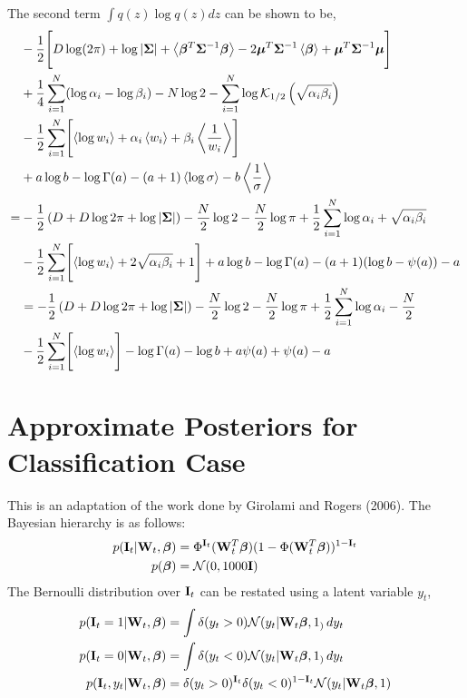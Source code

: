 \begin{appendices}
The second term $\int q(z)\log q(z)dz$ can be shown to be,
\begin{align}
\nonumber&-\frac{1}{2}\Biggl[D\log(2\pi)+\log |{\mathbf{\Sigma}}|+\left\langle\bm{\beta}^T{\mathbf{\Sigma}}^{-1}\bm{\beta}\right\rangle-2{\boldsymbol{\mu}}^T{\mathbf{\Sigma}}^{-1}\left\langle\bm{\beta}\right\rangle+{\boldsymbol{\mu}}^T{\mathbf{\Sigma}}^{-1}{\boldsymbol{\mu}}\Biggr]\\
&\nonumber+\frac{1}{4}\sum_{i=1}^{N}(\log\alpha_i-\log\beta_i)-N\log 2- \sum_{i=1}^{N}\log\mathcal{K}_{1/2}\left(\sqrt{\alpha_i\beta_i}\right)\\
\nonumber&-\frac{1}{2}\sum_{i=1}^{N}\Biggl[\left\langle\log w_i\right\rangle +\alpha_i\left\langle w_i\right\rangle+\beta_i\left\langle\frac{1}{w_i}\right\rangle\Biggr]\\
&\nonumber +a\log b - \log \Gamma(a)-(a+1)\left\langle\log \sigma\right\rangle-b\left\langle\frac{1}{\sigma}\right\rangle
\\ \nonumber=&-\frac{1}{2}\left(D+D\log2\pi+\log|{\mathbf{\Sigma}}|\right)-\frac{N}{2}\log 2-\frac{N}{2}\log\pi+\frac{1}{2}\sum_{i=1}^{N}\log\alpha_i+\sqrt{\alpha_i\beta_i}\\
\nonumber&-\frac{1}{2}\sum_{i=1}^{N}\Biggl[\left\langle\log w_i\right\rangle +2\sqrt{\alpha_i\beta_i}+1\Biggr]+a\log b -\log \Gamma(a)-(a+1)(\log b-\psi(a))-a\\
&\nonumber=-\frac{1}{2}\left(D+D\log2\pi+\log|{\mathbf{\Sigma}}|\right)-\frac{N}{2}\log 2-\frac{N}{2}\log\pi+\frac{1}{2}\sum_{i=1}^{N}\log\alpha_i-\frac{N}{2}\\
&-\frac{1}{2}\sum_{i=1}^{N}\Biggl[\left\langle\log w_i\right\rangle\Biggr]-\log \Gamma(a)-\log b+a\psi(a)+\psi(a)-a
\end{align}

\section{Approximate Posteriors for Classification Case}
This is an adaptation of the work done by Girolami and Rogers (2006). The Bayesian hierarchy is as follows:
\begin{align}
\nonumber p(\mathbf{I}_t|\mathbf{W}_t,\bm{\beta})&=\Phi^{\mathbf{I}_t}(\mathbf{W}_t^T\bm{\beta})(1-\Phi(\mathbf{W}_t^T\bm{\beta}))^{1-\mathbf{I}_t}\\
\nonumber p(\bm{\beta}) & = {\mathcal{N}}(0,1000\mathbf{I})
\end{align}
The Bernoulli distribution over $\mathbf{I}_t$ can be restated using a latent variable $y_t$,
\begin{align}
\nonumber p(\mathbf{I}_t=1|\mathbf{W}_t,\bm{\beta})&=\int \delta(y_t>0){\mathcal{N}}(y_t|\mathbf{W}_t\bm{\beta},1_)\,dy_t\\
\nonumber p(\mathbf{I}_t=0|\mathbf{W}_t,\bm{\beta})&=\int \delta(y_t<0){\mathcal{N}}(y_t|\mathbf{W}_t\bm{\beta},1_)\,dy_t\\
p(\mathbf{I}_t,y_t|\mathbf{W}_t,\bm{\beta})&=\delta(y_t>0)^{\mathbf{I}_t}\delta(y_t<0)^{1-\mathbf{I}_t}{\mathcal{N}}(y_t|\mathbf{W}_t\bm{\beta},1)
\end{align}


\end{appendices}
